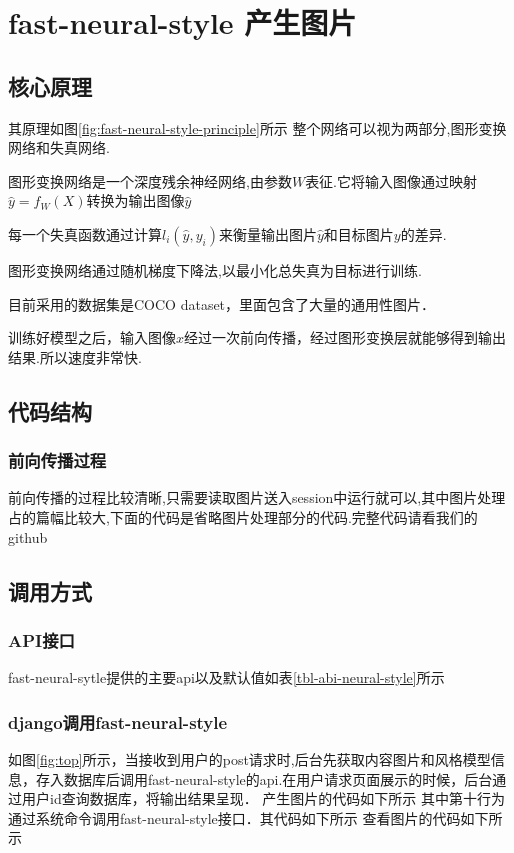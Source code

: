 \section{fast-neural-style 产生图片}
\subsection{核心原理}
其原理如图\ref{fig:fast-neural-style-principle}所示
整个网络可以视为两部分,图形变换网络和失真网络.

图形变换网络是一个深度残余神经网络,由参数$W$表征.它将输入图像通过映射$\hat y=f_W(X)$转换为输出图像$\hat y$

每一个失真函数通过计算$l_i(\hat y,y_i)$来衡量输出图片$\hat y$和目标图片$y$的差异.

图形变换网络通过随机梯度下降法,以最小化总失真为目标进行训练.

目前采用的数据集是COCO dataset，里面包含了大量的通用性图片．

训练好模型之后，输入图像$x$经过一次前向传播，经过图形变换层就能够得到输出结果.所以速度非常快.
\subsection{代码结构}
\subsubsection{前向传播过程}
前向传播的过程比较清晰,只需要读取图片送入session中运行就可以,其中图片处理占的篇幅比较大,下面的代码是省略图片处理部分的代码.完整代码请看我们的github\cite{my-fast-neural-sytle-tensorflow}

\subsection{调用方式}

\subsubsection{API接口}
fast-neural-sytle提供的主要api以及默认值如表\ref{tbl-abi-neural-style}所示
\subsubsection{django调用fast-neural-style}
如图\ref{fig:top}所示，当接收到用户的post请求时,后台先获取内容图片和风格模型信息，存入数据库后调用fast-neural-style的api.在用户请求页面展示的时候，后台通过用户id查询数据库，将输出结果呈现．
产生图片的代码如下所示
其中第十行为通过系统命令调用fast-neural-style接口．其代码如下所示
查看图片的代码如下所示
